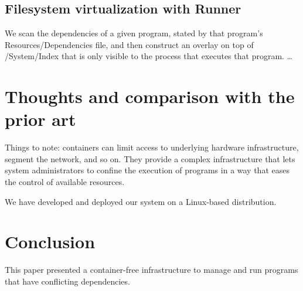 \documentclass[sigplan, anonymous]{acmart}
\begin{document}
\subsection{Filesystem virtualization with Runner}
We scan the dependencies of a given program, stated by that program's Resources/Dependencies
file, and then construct an overlay on top of /System/Index that is only visible to the process
that executes that program. \ldots


\section{Thoughts and comparison with the prior art}
Things to note: containers can limit access to underlying hardware infrastructure, segment the
network, and so on. They provide a complex infrastructure that lets system administrators to
confine the execution of programs in a way that eases the control of available resources.

We have developed and deployed our system on a Linux-based distribution.

\section{Conclusion}
This paper presented a container-free infrastructure to manage and run programs that have
conflicting dependencies. 



\end{document}
